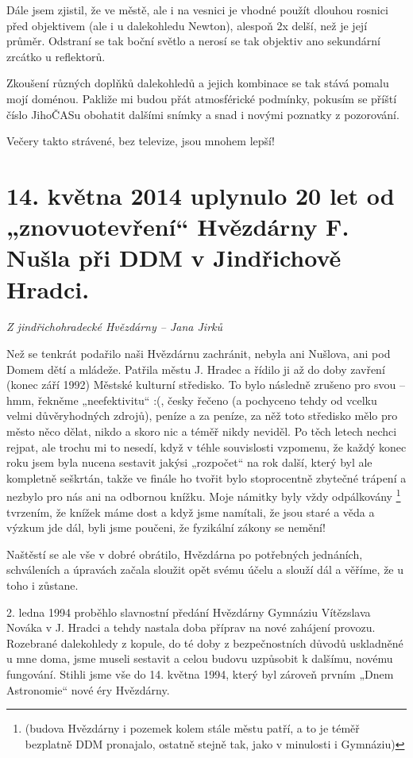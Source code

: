 \documentclass[10pt,a5paper,twoside]{book}
\newcommand{\autor}[1]{
	\begin{flushright}
	\textit{#1}
	\end{flushright}
}
\begin{document}
Dále jsem zjistil, že ve městě, ale i na vesnici je vhodné použít dlouhou rosnici před objektivem (ale i u dalekohledu Newton), alespoň 2x delší, než je její průměr. Odstraní se tak boční světlo a nerosí se tak objektiv ano sekundární zrcátko u reflektorů.

Zkoušení různých doplňků dalekohledů a jejich kombinace se tak stává pomalu mojí doménou. Pakliže mi budou přát atmosférické podmínky, pokusím se příští číslo JihoČASu obohatit dalšími snímky a snad i novými poznatky z pozorování.


Večery takto strávené, bez televize, jsou mnohem lepší!

\section*{14. května 2014 uplynulo 20 let od „znovuotevření“ Hvězdárny F. Nušla při DDM v Jindřichově Hradci.}
\autor{Z jindřichohradecké Hvězdárny – Jana Jirků}

Než se tenkrát podařilo naši Hvězdárnu zachránit, nebyla ani Nušlova, ani pod Domem dětí a mládeže. Patřila městu J. Hradec a řídilo ji až do doby zavření (konec září 1992) Městské kulturní středisko. To bylo následně zrušeno pro svou – hmm, řekněme „neefektivitu“ :(, česky řečeno (a pochyceno tehdy od vcelku velmi důvěryhodných zdrojů), peníze a za peníze, za něž toto středisko mělo pro město něco dělat, nikdo a skoro nic a téměř nikdy neviděl. Po těch letech nechci rejpat, ale trochu mi to nesedí, když v téhle souvislosti vzpomenu, že každý konec roku jsem byla nucena sestavit jakýsi „rozpočet“ na rok další, který byl ale kompletně seškrtán, takže ve finále ho tvořit bylo stoprocentně zbytečné trápení a nezbylo pro nás ani na odbornou knížku. Moje námitky byly vždy odpálkovány \footnote{(budova Hvězdárny i pozemek kolem stále městu patří, a to je téměř bezplatně DDM pronajalo, ostatně stejně tak, jako v minulosti i Gymnáziu)} tvrzením, že knížek máme dost a když jsme namítali, že jsou staré a věda a výzkum jde dál, byli jsme poučeni, že fyzikální zákony se nemění! 

Naštěstí se ale vše v dobré obrátilo, Hvězdárna po potřebných jednáních, schváleních a úpravách začala sloužit opět svému účelu a slouží dál a věříme, že u toho i zůstane.

2. ledna 1994 proběhlo slavnostní předání Hvězdárny Gymnáziu Vítězslava Nováka v J. Hradci a tehdy nastala doba příprav na nové zahájení provozu. Rozebrané dalekohledy z kopule, do té doby z bezpečnostních důvodů uskladněné u mne doma, jsme museli sestavit a celou budovu uzpůsobit k dalšímu, novému fungování. Stihli jsme vše do 14. května 1994, který byl zároveň prvním „Dnem Astronomie“ nové éry Hvězdárny.
\end{document}
